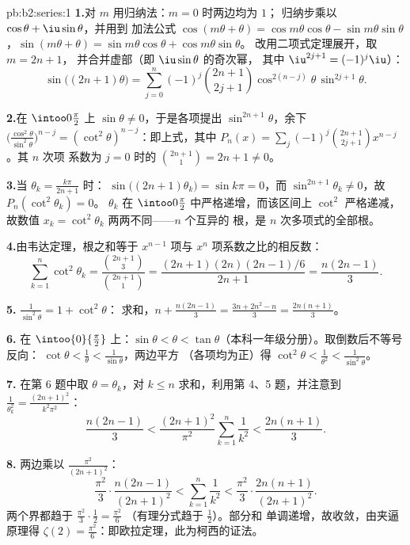 \begin{solution}{pb:b2:series:1}
\textbf{1.}对 $m$ 用归纳法：$m = 0$ 时两边均为 $1$；
归纳步乘以 $\cos\theta + \iu\sin\theta$，并用到
加法公式 $\cos(m\theta + \theta) =
\cos m\theta\cos\theta - \sin m\theta\sin\theta$，$\sin(m\theta
+ \theta) = \sin m\theta\cos\theta + \cos m\theta\sin\theta$。
改用二项式定理展开，取 $m = 2n+1$，
并合并虚部（即 $\iu\sin\theta$ 的奇次幂，
其中 $\iu^{2j+1} = (-1)^j\iu$）：
\[
\sin\bigl((2n{+}1)\theta\bigr) = \sum_{j=0}^{n}(-1)^j
\binom{2n+1}{2j+1}\cos^{2(n-j)}\theta\,\sin^{2j+1}\theta .
\]

\textbf{2.}在 $\intoo0{\frac\pi2}$ 上 $\sin\theta \neq 0$，于是各项提出
$\sin^{2n+1}\theta$，余下
$\bigl(\frac{\cos^2\theta}{\sin^2\theta}\bigr)^{n-j} =
(\cot^2\theta)^{n-j}$：即上式，其中 $P_n(x) =
\sum_j(-1)^j\binom{2n+1}{2j+1}x^{n-j}$。其 $n$ 次项
系数为 $j = 0$ 时的 $\binom{2n+1}{1} = 2n + 1 \neq 0$。

\textbf{3.}当 $\theta_k = \frac{k\pi}{2n+1}$ 时：
$\sin\bigl((2n{+}1)\theta_k\bigr) = \sin k\pi = 0$，而
$\sin^{2n+1}\theta_k \neq 0$，故 $P_n(\cot^2\theta_k) = 0$。
$\theta_k$ 在 $\intoo0{\frac\pi2}$ 中严格递增，而该区间上
$\cot^2$ 严格递减，故数值 $x_k =
\cot^2\theta_k$ 两两不同——$n$ 个互异的
根，是 $n$ 次多项式的全部根。

\textbf{4.}由韦达定理，根之和等于
$x^{n-1}$ 项与 $x^n$ 项系数之比的相反数：
\[
\sum_{k=1}^{n}\cot^2\theta_k =
\frac{\binom{2n+1}{3}}{\binom{2n+1}{1}}
= \frac{(2n+1)(2n)(2n-1)/6}{2n+1} = \frac{n(2n-1)}{3}.
\]

\textbf{5.} $\frac{1}{\sin^2\theta} = 1 + \cot^2\theta$：
求和，$n + \frac{n(2n-1)}3 = \frac{3n + 2n^2 - n}{3} =
\frac{2n(n+1)}{3}$。

\textbf{6.} 在 $\intoo{0}{\frac\pi2}$ 上：$\sin\theta < \theta <
\tan\theta$（本科一年级分册）。取倒数后不等号反向：
$\cot\theta < \frac1\theta < \frac1{\sin\theta}$，两边平方
（各项均为正）得 $\cot^2\theta < \frac1{\theta^2} <
\frac1{\sin^2\theta}$。

\textbf{7.} 在第 6 题中取 $\theta = \theta_k$，对 $k \leq
n$ 求和，利用第 4、5 题，并注意到 $\frac1{\theta_k^2} =
\frac{(2n+1)^2}{k^2\pi^2}$：
\[
\frac{n(2n-1)}3 < \frac{(2n+1)^2}{\pi^2}\sum_{k=1}^n\frac1{k^2}
< \frac{2n(n+1)}3 .
\]

\textbf{8.} 两边乘以 $\frac{\pi^2}{(2n+1)^2}$：
\[
\frac{\pi^2}{3}\cdot\frac{n(2n-1)}{(2n+1)^2}
< \sum_{k=1}^{n}\frac1{k^2} <
\frac{\pi^2}{3}\cdot\frac{2n(n+1)}{(2n+1)^2}.
\]
两个界都趋于 $\frac{\pi^2}3\cdot\frac12 = \frac{\pi^2}6$
（有理分式趋于 $\frac12$）。部分和
单调递增，故收敛，由夹逼原理得 $\zeta(2) =
\frac{\pi^2}6$：即欧拉定理，此为柯西的证法。


\end{solution}
